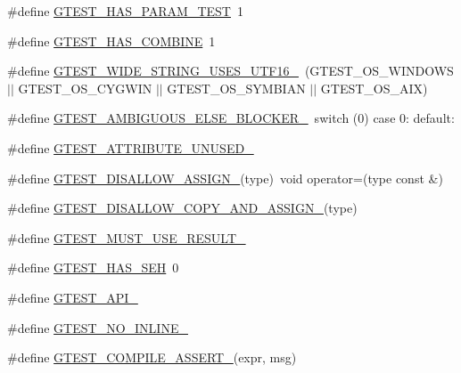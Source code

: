 \begin{DoxyCompactItemize}
\item 
\#define \hyperlink{gtest-port_8h_a743ee591e0b9a044e3d7513ad5ab5ef9}{\-G\-T\-E\-S\-T\-\_\-\-H\-A\-S\-\_\-\-P\-A\-R\-A\-M\-\_\-\-T\-E\-S\-T}~1
\item 
\#define \hyperlink{gtest-port_8h_a91a068d3bf6855b6f399f01836ae1482}{\-G\-T\-E\-S\-T\-\_\-\-H\-A\-S\-\_\-\-C\-O\-M\-B\-I\-N\-E}~1
\item 
\#define \hyperlink{gtest-port_8h_a0e3904ca8d62334ab5f29c057dceb6a1}{\-G\-T\-E\-S\-T\-\_\-\-W\-I\-D\-E\-\_\-\-S\-T\-R\-I\-N\-G\-\_\-\-U\-S\-E\-S\-\_\-\-U\-T\-F16\-\_\-}~(\-G\-T\-E\-S\-T\-\_\-\-O\-S\-\_\-\-W\-I\-N\-D\-O\-W\-S $|$$|$ \-G\-T\-E\-S\-T\-\_\-\-O\-S\-\_\-\-C\-Y\-G\-W\-I\-N $|$$|$ \-G\-T\-E\-S\-T\-\_\-\-O\-S\-\_\-\-S\-Y\-M\-B\-I\-A\-N $|$$|$ \-G\-T\-E\-S\-T\-\_\-\-O\-S\-\_\-\-A\-I\-X)
\item 
\#define \hyperlink{gtest-port_8h_a00b3684a621ce1422b55a0e7e8a6aecb}{\-G\-T\-E\-S\-T\-\_\-\-A\-M\-B\-I\-G\-U\-O\-U\-S\-\_\-\-E\-L\-S\-E\-\_\-\-B\-L\-O\-C\-K\-E\-R\-\_\-}~switch (0) case 0\-: default\-:
\item 
\#define \hyperlink{gtest-port_8h_acdd47601a9376161c349a5881ccc6918}{\-G\-T\-E\-S\-T\-\_\-\-A\-T\-T\-R\-I\-B\-U\-T\-E\-\_\-\-U\-N\-U\-S\-E\-D\-\_\-}
\item 
\#define \hyperlink{gtest-port_8h_ac593b50ce24257d5b6aa84845c344c9e}{\-G\-T\-E\-S\-T\-\_\-\-D\-I\-S\-A\-L\-L\-O\-W\-\_\-\-A\-S\-S\-I\-G\-N\-\_\-}(type)~void operator=(type const \&)
\item 
\#define \hyperlink{gtest-port_8h_aed8c1888c32b588b0681e88b95031e29}{\-G\-T\-E\-S\-T\-\_\-\-D\-I\-S\-A\-L\-L\-O\-W\-\_\-\-C\-O\-P\-Y\-\_\-\-A\-N\-D\-\_\-\-A\-S\-S\-I\-G\-N\-\_\-}(type)
\item 
\#define \hyperlink{gtest-port_8h_a8e5aab8276b2645f64f41c9e3021b935}{\-G\-T\-E\-S\-T\-\_\-\-M\-U\-S\-T\-\_\-\-U\-S\-E\-\_\-\-R\-E\-S\-U\-L\-T\-\_\-}
\item 
\#define \hyperlink{gtest-port_8h_a8f6a84e8be3c94cd1f6f46a136df2c62}{\-G\-T\-E\-S\-T\-\_\-\-H\-A\-S\-\_\-\-S\-E\-H}~0
\item 
\#define \hyperlink{gtest-port_8h_aa73be6f0ba4a7456180a94904ce17790}{\-G\-T\-E\-S\-T\-\_\-\-A\-P\-I\-\_\-}
\item 
\#define \hyperlink{gtest-port_8h_a9945cbd967fbccb15f8de711f58955c7}{\-G\-T\-E\-S\-T\-\_\-\-N\-O\-\_\-\-I\-N\-L\-I\-N\-E\-\_\-}
\item 
\#define \hyperlink{gtest-port_8h_ae1f37dc71d5daa6fb49ca1b6047d4a8c}{\-G\-T\-E\-S\-T\-\_\-\-C\-O\-M\-P\-I\-L\-E\-\_\-\-A\-S\-S\-E\-R\-T\-\_\-}(expr, msg)
$$
\end{DoxyCompactItemize}

